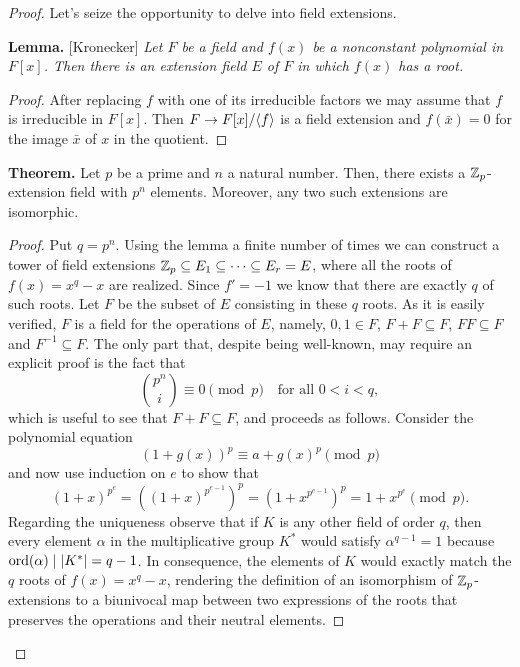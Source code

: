 \begin{solution}
\begin{proof} Let's seize the opportunity to delve into field extensions.

\medskip

\textbf{Lemma.} [Kronecker] \textit{Let\/ $F$ be a field and\/ $f(x)$ be a nonconstant polynomial in\/ $F[x]$. Then there is an extension field\/ $E$ of\/ $F$ in which\/ $f(x)$ has a root.}

\begin{proof} After replacing $f$ with one of its irreducible factors we may assume that $f$ is irreducible in $F[x]$. Then $F\to F[x]/\langle f\rangle$ is a field extension and $f(\bar x)=0$ for the image $\bar x$ of $x$ in the quotient.  \end{proof}

\medskip

\textbf{Theorem.} Let $p$ be a prime and $n$ a natural number. Then, there exists a $\mathbb{Z}_p$-extension field with $p^n$ elements. Moreover, any two such extensions are isomorphic.

\begin{proof} Put $q=p^n$. Using the lemma a finite number of times we can construct a tower of field extensions $\mathbb{Z}_p\subseteq E_1\subseteq\cdots\subseteq E_r=E$, where all the roots of $f(x)=x^q-x$ are realized. Since $f'=-1$ we know that there are exactly $q$ of such roots. Let $F$ be the subset of $E$ consisting in these $q$ roots. As it is easily verified, $F$ is a field for the operations of $E$, namely, $0,1\in F$, $F+F\subseteq F$, $FF\subseteq F$ and $F^{-1}\subseteq F$. The only part that, despite being well-known, may require an explicit proof is the fact that
$$
    \binom{p^n}{i}\equiv0\pmod p\quad\text{for all }0<i<q,
$$
which is useful to see that $F+F\subseteq F$, and proceeds as follows. Consider the polynomial equation
$$
    (1 + g(x))^p\equiv a + g(x)^p\pmod p
$$
and now use induction on $e$ to show that
$$
    (1+x)^{p^e} = ((1+x)^{p^{e-1}})^p = (1+x^{p^{e-1}})^p=1 + x^{p^e} \pmod p.
$$
Regarding the uniqueness observe that if $K$ is any other field of order $q$, then every element $\alpha$ in the multiplicative group $K^*$ would satisfy $\alpha^{q-1}=1$ because ${\rm ord}(\alpha)\mid|K^*|=q-1$. In consequence, the elements of $K$ would exactly match the $q$ roots of $f(x)=x^q-x$, rendering the definition of an isomorphism of $\mathbb{Z}_p$-extensions to a biunivocal map between two expressions of the roots that preserves the operations and their neutral elements.  \end{proof}


\medskip


\end{proof}
\end{solution}
